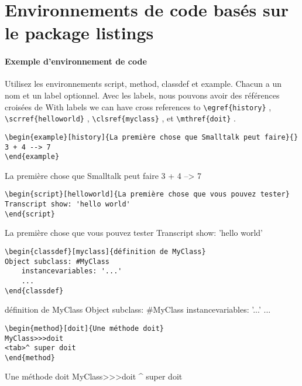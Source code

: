 \documentclass[a4paper,10pt,twoside]{book}
\begin{document}
\sloppy
\mainmatter
\section*{Environnements de code basés sur le package listings}
\paragraph{Exemple d'environnement de code}
Utilisez les environnements script, method, classdef et example.
Chacun a un nom et un label optionnel.
Avec les labels, nous pouvons avoir des références croisées de 
With labels we can have cross references to
\verb|\egref{history}| ,
\verb|\scrref{helloworld}| ,
\verb|\clsref{myclass}| ,
et \verb|\mthref{doit}| .

\begin{verbatim}
\begin{example}[history]{La première chose que Smalltalk peut faire}{}
3 + 4 --> 7
\end{example}
\end{verbatim}
\begin{example}[history]{La première chose que Smalltalk peut faire}{}
3 + 4 --> 7
\end{example}

\begin{verbatim}
\begin{script}[helloworld]{La première chose que vous pouvez tester}
Transcript show: 'hello world'
\end{script}
\end{verbatim}
\begin{script}[helloworld]{La première chose que vous pouvez tester}
Transcript show: 'hello world'
\end{script}

\begin{verbatim}
\begin{classdef}[myclass]{définition de MyClass}
Object subclass: #MyClass
	instancevariables: '...'
	...
\end{classdef}
\end{verbatim}
\begin{classdef}[myclass]{définition de MyClass}
Object subclass: #MyClass
	instancevariables: '...'
	...
\end{classdef}

\begin{verbatim}
\begin{method}[doit]{Une méthode doit}
MyClass>>>doit
<tab>^ super doit
\end{method}
\end{verbatim}
\begin{method}[doit]{Une méthode doit}
MyClass>>>doit
	^ super doit
\end{method}
\end{document}
